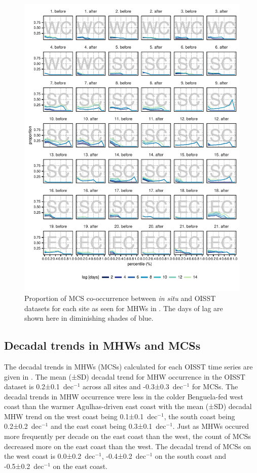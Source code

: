 \documentclass[a4paper,10pt,review]{elsarticle}
\begin{document}
\begin{figure}
\includegraphics[width=1.0\textwidth]{figure5.pdf}
\caption{Proportion of MCS co-occurrence between \emph{in situ} and OISST datasets for each site as seen for MHWs in . The days of lag are shown here in diminishing shades of blue.}
\label{fig:Figure5}
\end{figure}

\subsection{Decadal trends in MHWs and MCSs}
The decadal trends in MHWs (MCSs) calculated for each OISST time series are given in . The mean (±SD) decadal trend for MHW occurrence in the OISST dataset is 0.2±0.1~dec$^{-1}$ across all sites and -0.3±0.3~dec$^{-1}$ for MCSs. The decadal trends in MHW occurrence were less in the colder Benguela-fed west coast than the warmer Agulhas-driven east coast with the mean (±SD) decadal MHW trend on the west coast being 0.1±0.1~dec$^{-1}$, the south coast being 0.2±0.2~dec$^{-1}$ and the east coast being 0.3±0.1~dec$^{-1}$. Just as MHWs occured more frequently per decade on the east coast than the west, the count of MCSs decreased more on the east coast than the west. The decadal trend of MCSs on the west coast is 0.0±0.2~dec$^{-1}$, -0.4±0.2~dec$^{-1}$ on the south coast and -0.5±0.2~dec$^{-1}$ on the east coast.
\end{document}
